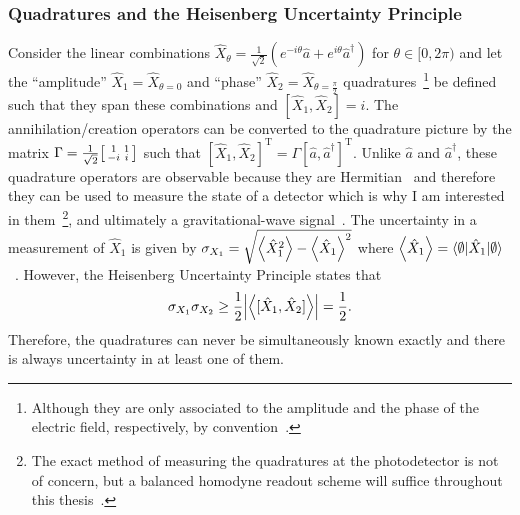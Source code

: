 \subsubsection{Quadratures and the Heisenberg Uncertainty Principle}
Consider the linear combinations $\hat{X}_\theta=\frac{1}{\sqrt 2}(e^{-i \theta}\hat{a}+e^{i \theta}\hat{a}^\dag)$ for $\theta\in[0,2\pi)$ and let the ``amplitude'' $\hat{X}_1=\hat{X}_{\theta=0}$ and ``phase'' $\hat{X}_2=\hat{X}_{\theta=\frac{\pi}{2}}$ quadratures~\footnote{Although they are only associated to the amplitude and the phase of the electric field, respectively, by convention~\cite{danilishinQuantumMeasurementTheory2012}.} be defined such that they span these combinations and $[\hat{X}_1,\hat{X}_2]=i$. The annihilation/creation operators can be converted to the quadrature picture by the matrix $\Gamma = \frac{1}{\sqrt2} \begin{bsmallmatrix}1 & 1 \\-i & i\end{bsmallmatrix}$ such that $[\hat{X}_1,\hat{X}_2]^\text{T}=\Gamma[\hat{a},\hat{a}^\dag]^\text{T}$. %
Unlike $\hat a$ and $\hat a^\dag$, these quadrature operators are observable because they are Hermitian~\cite{} and therefore they can be used to measure the state of a detector which is why I am interested in them~\footnote{The exact method of measuring the quadratures at the photodetector is not of concern, but a balanced homodyne readout scheme will suffice throughout this thesis~\cite{}.}, and ultimately a gravitational-wave signal~\cite{}. The uncertainty in a measurement of $\hat{X}_1$ is given by $\sigma_{X_1}=\sqrt{\ev{\hat{X}_1^2}-\ev{\hat{X}_1}^2}$ where $\ev{\hat{X}_1}=\langle\emptyset\lvert\hat{X}_1\rvert\emptyset\rangle$~\cite{}. However, the Heisenberg Uncertainty Principle states that~\cite{}
\begin{equation}\label{eq:HUP_time_domain}
\sigma_{X_1}\sigma_{X_2}\geq\frac{1}{2}\abs{\ev{[\hat{X}_1,\hat{X}_2]}}=\frac{1}{2}.
\end{equation}
Therefore, the quadratures can never be simultaneously known exactly and there is always uncertainty in at least one of them. %
